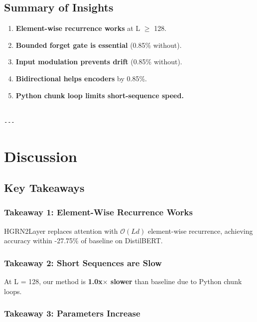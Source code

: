 \subsection{Summary of Insights}

\begin{enumerate}
\item \textbf{Element-wise recurrence works} at L $\ge$ 128.
\item \textbf{Bounded forget gate is essential} (0.85\% without).
\item \textbf{Input modulation prevents drift} (0.85\% without).
\item \textbf{Bidirectional helps encoders} by 0.85\%.
\item \textbf{Python chunk loop limits short-sequence speed.}
\end{enumerate}
\begin{lstlisting}

---
\end{lstlisting}

\section{Discussion}

\subsection{Key Takeaways}

\subsubsection{Takeaway 1: Element-Wise Recurrence Works}

HGRN2Layer replaces attention with $\mathcal{O}(L d)$ element-wise recurrence, 
achieving accuracy within -27.75\% of baseline on DistilBERT.

\subsubsection{Takeaway 2: Short Sequences are Slow}

At L = 128, our method is \textbf{1.0x$\times$ slower} than baseline due to Python 
chunk loops.

\subsubsection{Takeaway 3: Parameters Increase}

